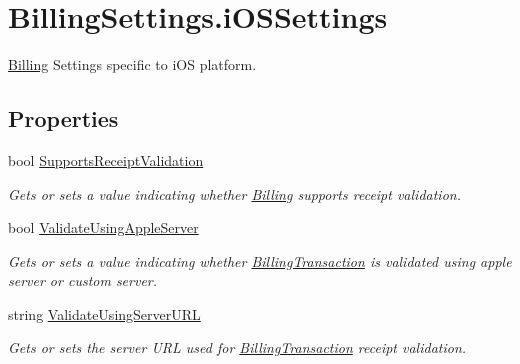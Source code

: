 \hypertarget{class_voxel_busters_1_1_native_plugins_1_1_billing_settings_1_1i_o_s_settings}{}\section{Billing\+Settings.\+i\+O\+S\+Settings}
\label{class_voxel_busters_1_1_native_plugins_1_1_billing_settings_1_1i_o_s_settings}


\hyperlink{class_voxel_busters_1_1_native_plugins_1_1_billing}{Billing} Settings specific to i\+O\+S platform.  


\subsection*{Properties}
\begin{DoxyCompactItemize}
\item 
bool \hyperlink{class_voxel_busters_1_1_native_plugins_1_1_billing_settings_1_1i_o_s_settings_af79c5f43a78e0daddd2ad737658fcc02}{Supports\+Receipt\+Validation}
\begin{DoxyCompactList}\small\item\em Gets or sets a value indicating whether \hyperlink{class_voxel_busters_1_1_native_plugins_1_1_billing}{Billing} supports receipt validation. \end{DoxyCompactList}\item 
bool \hyperlink{class_voxel_busters_1_1_native_plugins_1_1_billing_settings_1_1i_o_s_settings_a6613c266db867c8a4f51491ddc4d08a7}{Validate\+Using\+Apple\+Server}
\begin{DoxyCompactList}\small\item\em Gets or sets a value indicating whether \hyperlink{class_voxel_busters_1_1_native_plugins_1_1_billing_transaction}{Billing\+Transaction} is validated using apple server or custom server. \end{DoxyCompactList}\item 
string \hyperlink{class_voxel_busters_1_1_native_plugins_1_1_billing_settings_1_1i_o_s_settings_ab08555b9531853cae78f724a1967a09b}{Validate\+Using\+Server\+U\+R\+L}
\begin{DoxyCompactList}\small\item\em Gets or sets the server U\+R\+L used for \hyperlink{class_voxel_busters_1_1_native_plugins_1_1_billing_transaction}{Billing\+Transaction} receipt validation. \end{DoxyCompactList}\end{DoxyCompactItemize}


